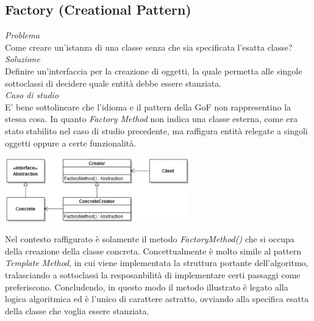 \documentclass{article}
\begin{document}
\subsection*{Factory (Creational Pattern)}
\large
\textit{Problema}\\
Come creare un'istanza di una classe senza che sia specificata l'esatta classe?\vspace*{14pt}\\
\textit{Soluzione}\\
Definire un'interfaccia per la creazione di oggetti, la quale permetta alle singole sottoclassi di decidere quale entità debbe essere stanziata.\vspace*{14pt}\\
\textit{Caso di studio}\\
E' bene sottolineare che l'idioma e il pattern della GoF non rappresentino la stessa cosa. In quanto \textit{Factory Method} non indica una classe esterna, come era stato stabilito nel caso di studio precedente, ma raffigura entità relegate a singoli oggetti oppure a certe funzionalità.\vspace*{7pt}
\begin{center}
    \includegraphics[width=0.6\textwidth]{foto 2.png}
\end{center}
Nel contesto raffigurato è solamente il metodo \textit{FactoryMethod()} che si occupa della creazione della classe concreta. Concettualmente è molto simile al pattern \textit{Template Method}, in cui viene implementata la struttura portante dell'algoritmo, tralasciando a sottoclassi la resposanbilità di implementare certi passaggi come preferiscono. Concludendo, in questo modo il metodo illustrato è legato alla logica algoritmica ed è l'unico di carattere astratto, ovviando alla specifica esatta della classe che voglia essere stanziata.  
\end{document}
